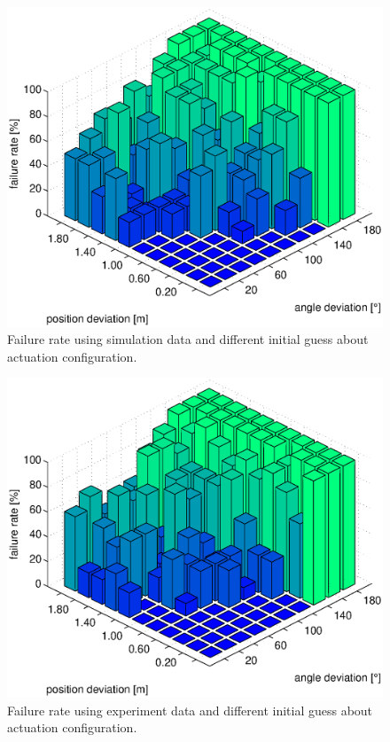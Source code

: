 \begin{figure}[hbtp]
\captionsetup{width=0.9\textwidth}
\centering
\includegraphics[width = \textwidth]{images/results/convergence_analysis_init_deviation_sim_bar.eps}
\caption{Failure rate using simulation data and different initial guess about actuation configuration.}
\label{fig:result_sim_convergece_region}
\end{figure}
\begin{figure}[hbtp]
\captionsetup{width=0.9\textwidth}
\centering
\includegraphics[width = \textwidth]{images/results/convergence_analysis_init_deviation_real_bar.eps}
\caption{Failure rate using experiment data and different initial guess about actuation configuration.}
\label{fig:result_real_convergece_region}
\end{figure}


